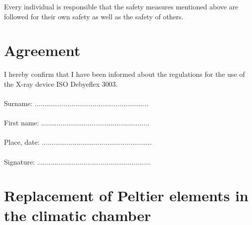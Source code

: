 \documentclass[a4paper,12pt,twoside]{article}
\begin{document}
\begin{appendices}
Every individual is responsible that the safety measures mentioned above are followed for their own safety as well as the safety of others.

\section*{Agreement}
I hereby confirm that I have been informed about the regulations for the use of the X-ray device ISO Debyeflex 3003. \\
\\
Surname: ........................................................... \\
\\
First name: ........................................................ \\
\\
Place, date: ......................................................... \\
\\
Signature: ...........................................................

\newpage

\section{Replacement of Peltier elements in the climatic chamber} \label{Peltier}


\end{appendices}
\end{document}
